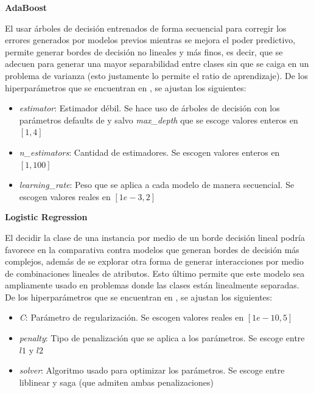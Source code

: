 \documentclass[12pt,a4paper]{article}
\begin{document}
{{            \textbf{AdaBoost}\\
            {
                El usar árboles de decisión entrenados de forma secuencial para corregir los 
                errores generados por modelos previos mientras se mejora el poder predictivo, 
                permite generar bordes de decisión no lineales y más finos, es decir, que se 
                adecuen para generar una mayor separabilidad entre clases sin que se caiga en 
                un problema de varianza (esto justamente lo permite el ratio de aprendizaje). 
                De los hiperparámetros que se encuentran en \cite{sklearn_adaboost}, se ajustan 
                los siguientes:
                \begin{itemize}
                    \item \emph{estimator}: Estimador débil. Se hace uso de árboles de decisión con los parámetros defaults de \cite{sklearn_tree} y salvo \emph{max\_depth} que se escoge valores enteros en $[1,4]$
                    \item \emph{n\_estimators}: Cantidad de estimadores. Se escogen valores enteros en $[1,100]$ 
                    \item \emph{learning\_rate}: Peso que se aplica a cada modelo de manera secuencial. Se escogen valores reales en $[1e-3,2]$
                \end{itemize}
            }

            \textbf{Logistic Regression}\\
            {
                El decidir la clase de una instancia por medio de un borde decisión lineal podría 
                favorece en la comparativa contra modelos que generan bordes de decisión más complejos, 
                además de se explorar otra forma de generar interacciones por medio de combinaciones 
                lineales de atributos. Esto último permite que este modelo sea ampliamente usado 
                en problemas donde las clases están linealmente separadas. De los hiperparámetros 
                que se encuentran en \cite{sklearn_logistic}, se ajustan los siguientes:
                \begin{itemize}
                    \item \emph{C}: Parámetro de regularización. Se escogen valores reales en $[1e-10,5]$
                    \item \emph{penalty}: Tipo de penalización que se aplica a los parámetros. Se escoge entre $l1$ y $l2$
                    \item \emph{solver}: Algoritmo usado para optimizar los parámetros. Se escoge entre liblinear y saga (que admiten ambas penalizaciones)
                \end{itemize}
            }

}}
\end{document}
